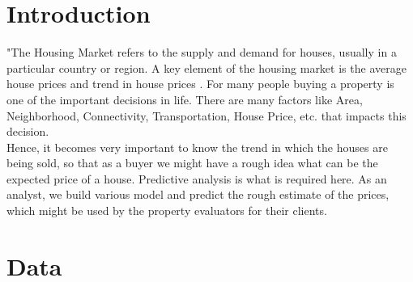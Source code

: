 \documentclass[fleqn,10pt]{SelfArx} %
\begin{document}
\flushbottom %

\maketitle %

\tableofcontents %

\thispagestyle{empty} %


\section*{Introduction} %
"The Housing Market refers to the supply and demand for houses, usually in a particular country or region. A key element of the housing market is the average house prices and trend in house prices \cite{REF:1}. For many people buying a property is one of the important decisions in life. There are many factors like Area, Neighborhood, Connectivity, Transportation, House Price, etc. that impacts this decision.
\\ Hence, it becomes very important to know the trend in which the houses are being sold, so that as a buyer we might have a rough idea what can be the expected price of a house. Predictive analysis is what is required here. As an analyst, we build various model and predict the rough estimate of the prices, which might be used by the property evaluators for their clients.



\section{Data}


\end{document}
